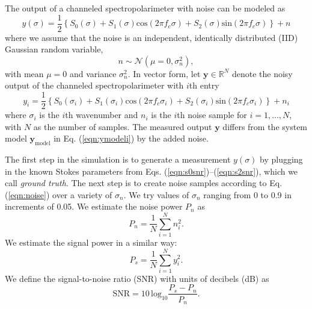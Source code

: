 \documentclass[10pt]{article}
\numberwithin{equation}{subsection}
\newcommand{\lbf}[1]{\ensuremath{{\boldsymbol #1}}}
\begin{document}
    The output of a channeled spectropolarimeter with noise can be modeled as
\begin{equation}
    y(\sigma) = \frac{1}{2} \left\{ S_0(\sigma) + S_1(\sigma) \text{cos}(2 \pi f_c \sigma) + S_2(\sigma) \text{sin}(2 \pi f_c \sigma) \right\} + n
    \label{eqn:ynoise}
\end{equation}
where we assume that the noise is an independent, identically distributed (IID) Gaussian random variable,
%
\begin{equation}
n \sim \mathcal N\left(\mu = 0, \sigma_n^2\right),
    \label{eqn:noise}
\end{equation}
%
with mean $\mu = 0$ and variance $\sigma_n^2$. In vector form, let $\lbf y \in \mathbb R^N$ denote the noisy output of the channeled spectropolarimeter with $i$th entry
\begin{equation}
    y_i = \frac{1}{2} \left\{ S_0(\sigma_i) + S_1(\sigma_i) \text{cos}(2 \pi f_c \sigma_i) + S_2(\sigma_i) \text{sin}(2 \pi f_c \sigma_i) \right\} + n_i
    \label{eqn:yinoise}
\end{equation}
where $\sigma_i$ is the $i$th wavenumber and $n_i$ is the $i$th noise sample for $i = 1, \dots, N$, with $N$ as the number of samples.
The measured output $\lbf y$ differs from the system model $\lbf y_{\text{model}}$ in Eq. (\ref{eqn:ymodeli}) by the added noise.

The first step in the simulation is to generate a measurement $y(\sigma)$ by plugging in the known Stokes parameters from Eqs. (\ref{eqn:s0snr})--(\ref{eqn:s2snr}), which we call \emph{ground truth}.
The next step is to create noise samples according to Eq. (\ref{eqn:noise}) over a variety of $\sigma_n$.
We try values of $\sigma_n$ ranging from 0 to 0.9 in increments of 0.05.
We estimate the noise power $P_n$ as
\begin{equation}
    P_n = \frac{1}{N} \sum_{i = 1}^{N} n_i^2.
    \label{eqn:pn}
\end{equation}
We estimate the signal power in a similar way:
\begin{equation}
    P_s = \frac{1}{N} \sum_{i = 1}^{N} y_i^2.
    \label{eqn:ps}
\end{equation}
We define the signal-to-noise ratio (SNR) with units of decibels (dB) as
\begin{equation}
    \text{SNR} = 10 \, \text{log}_{10} \frac{P_s - P_n}{P_n}.
    \label{eqn:snr}
\end{equation}
\end{document}
